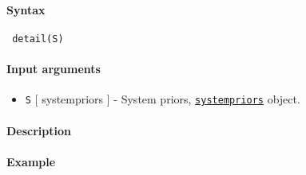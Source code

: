 


	\paragraph{Syntax}
 
 \begin{verbatim}
 detail(S)
 \end{verbatim}
 
 \paragraph{Input arguments}
 
 \begin{itemize}
 \item
   \texttt{S} {[} systempriors {]} - System priors,
   \href{systempriors/Contents}{\texttt{systempriors}} object.
 \end{itemize}
 
 \paragraph{Description}
 
 \paragraph{Example}


